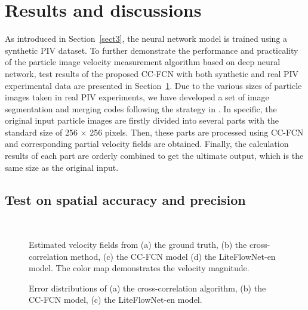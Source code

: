 \documentclass[%
 aip,
 amsmath,amssymb,
 reprint,%
]{revtex4-1}
\begin{document}
\section{Results and discussions}
\label{sect4}
As introduced in Section~\ref{sect3}, the neural network model is trained using a synthetic PIV dataset. To further demonstrate the performance and practicality of the particle image velocity measurement algorithm based on deep neural network, test results of the proposed CC-FCN with both synthetic and real PIV experimental data are presented in Section~\ref{sect4}.
Due to the various sizes of particle images taken in real PIV experiments, we have developed a set of image segmentation and merging codes following the strategy in \citet{cai2019,cai2019particle}.
In specific, the original input particle images are firstly divided into several parts with the standard size of 256 $\times$ 256 pixels. Then, these parts are processed using CC-FCN and corresponding partial velocity fields are obtained. Finally, the calculation results of each part are orderly combined to get the ultimate output, which is the same size as the original input.

\subsection{Test on spatial accuracy and precision}
\label{sect4.1}

\begin{figure*}
	\begin{center}
	    \\
		\caption{Estimated velocity fields from (a) the ground truth, (b) the cross-correlation method, (c) the CC-FCN model (d) the LiteFlowNet-en model. The color map demonstrates the velocity magnitude.}
		\label{fig3}
	\end{center}
\end{figure*}

\begin{figure*}[t]
	\begin{center}
		\caption{Error distributions of (a) the cross-correlation algorithm, (b) the CC-FCN model, (c) the LiteFlowNet-en model.}
		\label{fig4}
	\end{center}
\end{figure*}
\end{document}
